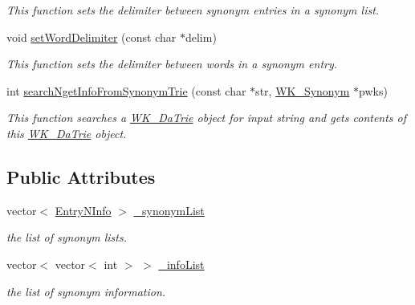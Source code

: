 \begin{CompactItemize}
\begin{CompactList}\small\item\em This function sets the delimiter between synonym entries in a synonym list. \item\end{CompactList}\item 
void \hyperlink{classkmaOrange_1_1SynonymContainer_7e23aea8d7bb9b468a870f7e31ff6893}{setWordDelimiter} (const char $\ast$delim)
\begin{CompactList}\small\item\em This function sets the delimiter between words in a synonym entry. \item\end{CompactList}\item 
int \hyperlink{classkmaOrange_1_1SynonymContainer_d17697e0744a34ea4d9ffe782e981cc4}{searchNgetInfoFromSynonymTrie} (const char $\ast$str, \hyperlink{classWK__Synonym}{WK\_\-Synonym} $\ast$pwks)
\begin{CompactList}\small\item\em This function searches a \hyperlink{classkmaOrange_1_1WK__DaTrie}{WK\_\-DaTrie} object for input string and gets contents of this \hyperlink{classkmaOrange_1_1WK__DaTrie}{WK\_\-DaTrie} object. \item\end{CompactList}\end{CompactItemize}
\subsection*{Public Attributes}
\begin{CompactItemize}
\item 
vector$<$ \hyperlink{classkmaOrange_1_1EntryNInfo}{EntryNInfo} $>$ \hyperlink{classkmaOrange_1_1SynonymContainer_37f7dd0dc8be871b8f2bf23188bd3098}{\_\-synonymList}
\begin{CompactList}\small\item\em the list of synonym lists. \item\end{CompactList}\item 
vector$<$ vector$<$ int $>$ $>$ \hyperlink{classkmaOrange_1_1SynonymContainer_005dd18f743edb6e29f6441658a9d059}{\_\-infoList}
\begin{CompactList}\small\item\em the list of synonym information. \item\end{CompactList}\end{CompactItemize}

